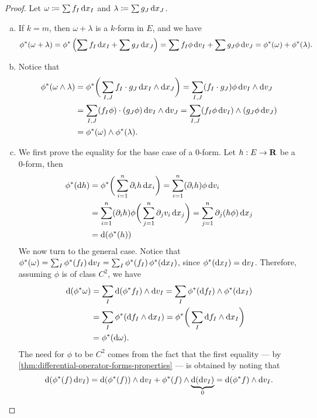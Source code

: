 \begin{proof}
Let \(\omega \coloneq \sum f_I\, \mathrm{d} x_I\) and \(\lambda \coloneq \sum g_J\,
\mathrm{d} x_J\).
\begin{enumerate}[(a)]\setlength\itemsep{0em}
\item If \(k = m\), then \(\omega + \lambda\) is a \(k\)-form in \(E\), and we
  have
  \[
    \phi^{*}(\omega + \lambda)
    = \phi^{*} \left( \sum f_I\, \mathrm{d} x_I + \sum g_J\, \mathrm{d} x_J \right)
    = \sum f_I \phi\, \mathrm{d} v_I + \sum g_J \phi\, \mathrm{d} v_J
    = \phi^{*}(\omega) + \phi^{*}(\lambda).
  \]
\item Notice that
  \begin{align*}
    \phi^{*}(\omega \wedge \lambda)
    &= \phi^{*} \bigg(
      \sum_{I, J} f_I \cdot g_J\, \mathrm{d} x_I \wedge \mathrm{d} x_J
    \bigg)
    = \sum_{I, J} (f_I \cdot g_J) \phi\, \mathrm{d} v_I \wedge \mathrm{d} v_J \\
    &= \sum_{I, J} (f_I \phi) \cdot (g_J \phi)\, \mathrm{d} v_I \wedge \mathrm{d} v_J
    = \sum_{I, J} (f_I \phi\, \mathrm{d} v_I) \wedge (g_J \phi\, \mathrm{d} v_J) \\
    &= \phi^{*}(\omega) \wedge \phi^{*}(\lambda).
  \end{align*}
\item We first prove the equality for the base case of a \(0\)-form. Let \(h: E
  \to \mathbf{R}\) be a \(0\)-form, then
  \begin{align*}
    \phi^{*} (\mathrm{d} h)
    &= \phi^{*} \bigg( \sum_{i=1}^n \partial_i h\, \mathrm{d} x_i \bigg)
    = \sum_{i=1}^n (\partial_i h) \phi\, \mathrm{d} v_i \\
    &= \sum_{i=1}^n (\partial_i h) \phi
      \bigg( \sum_{j=1}^{n} \partial_j v_i\, \mathrm{d} x_j \bigg)
    = \sum_{j=1}^n \partial_j (h \phi)\, \mathrm{d} x_j \\
    &= \mathrm{d} (\phi^{*}(h))
  \end{align*}
  We now turn to the general case. Notice that \(\phi^{*}(\omega) = \sum_I
  \phi^{*}(f_I)\, \mathrm{d} v_I = \sum_I \phi^{*}(f_I)\, \phi^{*}(\mathrm{d} x_{I})\),
  since \(\phi^{*} (\mathrm{d} x_I) = \mathrm{d} v_I\). Therefore, assuming \(\phi\) is of
  class \(C^2\), we have
  \begin{align*}
    \mathrm{d} (\phi^{*} \omega)
    &= \sum_I \mathrm{d}(\phi^{*} f_{I}) \wedge \mathrm{d} v_{I}
    = \sum_I \phi^{*}(\mathrm{d} f_I) \wedge \phi^{*} (\mathrm{d} x_{I}) \\
    &= \sum_I \phi^{*}(\mathrm{d} f_I \wedge \mathrm{d} x_I)
    = \phi^{*} \bigg( \sum_I \mathrm{d} f_I \wedge \mathrm{d} x_I \bigg) \\
    &= \phi^{*}(\mathrm{d} \omega).
  \end{align*}
  The need for \(\phi\) to be \(C^2\) comes from the fact that the first
  equality --- by \cref{thm:differential-operator-forms-properties} --- is
  obtained by noting that
  \[
    \mathrm{d} (\phi^{*}(f)\, \mathrm{d} v_I)
    = \mathrm{d} (\phi^{*}(f)) \wedge \mathrm{d} v_I
      + \phi^{*}(f) \wedge \underbrace{\mathrm{d}(\mathrm{d} v_I)}_{0}
    = \mathrm{d} (\phi^{*}f) \wedge \mathrm{d} v_I.
  \]
\end{enumerate}
\end{proof}

